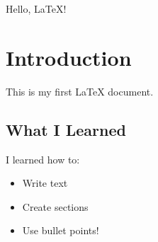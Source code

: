 \documentclass{article}  %
\begin{document}

Hello, \LaTeX!            %

\section{Introduction}    %
This is my first \LaTeX{} document.

\subsection{What I Learned} %
I learned how to:
\begin{itemize}
  \item Write text
  \item Create sections
  \item Use bullet points!
\end{itemize}
\end{document}
